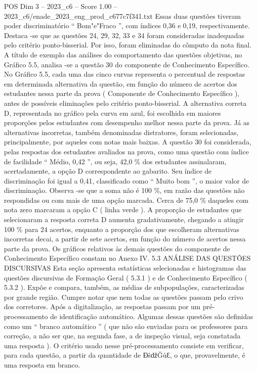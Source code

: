 \begin{textsample}{POS Dim 3 – 2023\_c6 – Score 1.00 – 2023\_c6/enade\_2023\_eng\_prod\_c677c7f341.txt}
Essas duas questões tiveram poder discriminatório “ Bom"e"Fraco ”, com índices 0,36 e 0,19, respectivamente.
Destaca -se que as questões 24, 29, 32, 33 e 34 foram consideradas inadequadas pelo critério ponto-bisserial.
Por isso, foram eliminadas do cômputo da nota final.
A título de exemplo das análises do comportamento das questões objetivas, no Gráfico 5.5, analisa -se a questão 30 do componente de Conhecimento Específico.
No Gráfico 5.5, cada uma das cinco curvas representa o percentual de respostas em determinada alternativa da questão, em função do número de acertos dos estudantes nessa parte da prova ( Componente de Conhecimento Específico ), antes de possíveis eliminações pelo critério ponto-bisserial.
A alternativa correta D, representada no gráfico pela curva em azul, foi escolhida em maiores proporções pelos estudantes com desempenho melhor nessa parte da prova.
Já as alternativas incorretas, também denominadas distratores, foram selecionadas, principalmente, por aqueles com notas mais baixas.
A questão 30 foi considerada, pelas respostas dos estudantes avaliados na prova, como uma questão com índice de facilidade “ Médio, 0,42 ”, ou seja, 42,0 \% dos estudantes assinalaram, acertadamente, a opção D correspondente ao gabarito.
Seu índice de discriminação foi igual a 0,41, classificado como “ Muito bom ”, o maior valor de discriminação.
Observa -se que a soma não é 100 \%, em razão das questões não respondidas ou com mais de uma opção marcada.
Cerca de 75,0 \% daqueles com nota zero marcaram a opção C ( linha verde ).
A proporção de estudantes que selecionaram a resposta correta D aumenta gradativamente, chegando a atingir 100 \% para 24 acertos, enquanto a proporção dos que escolheram alternativas incorretas decai, a partir de sete acertos, em função do número de acertos nessa parte da prova.
Os gráficos relativos às demais questões do componente de Conhecimento Específico constam no Anexo IV. 5.3 ANÁLISE DAS QUESTÕES DISCURSIVAS Esta seção apresenta estatísticas selecionadas e histogramas das questões discursivas de Formação Geral ( 5.3.1 ) e de Conhecimento Específico ( 5.3.2 ).
Expõe e compara, também, as médias de subpopulações, caracterizadas por grande região.
Cumpre notar que nem todas as questões passam pelo crivo dos corretores.
Após a digitalização, as respostas passam por um pré-processamento de identificação automático.
Algumas dessas questões são definidas como um “ branco automático ” ( que não são enviadas para os professores para correção, a não ser que, na segunda fase, a de inspeção visual, seja constatada uma resposta ).
O critério usado nesse pré-processamento consiste em verificar, para cada questão, a partir da quantidade de ƉŝǆĞůƐ, o que, provavelmente, é uma resposta em branco.

\end{textsample}
